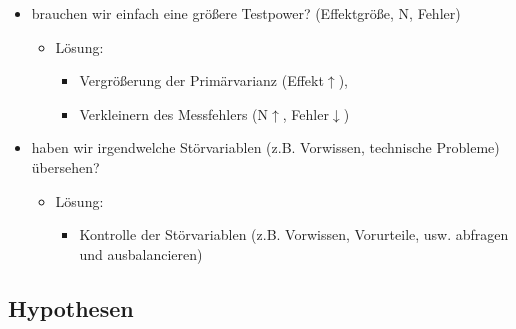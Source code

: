 \documentclass[
]{book}
\providecommand{\tightlist}{%
  \setlength{\itemsep}{0pt}\setlength{\parskip}{0pt}}
\begin{document}
\begin{itemize}
\item
  brauchen wir einfach eine größere Testpower? (Effektgröße, N, Fehler)

  \begin{itemize}
  \item
    Lösung:

    \begin{itemize}
    \tightlist
    \item
      Vergrößerung der Primärvarianz (Effekt\(\uparrow\)),
    \item
      Verkleinern des Messfehlers (N\(\uparrow\), Fehler\(\downarrow\))
    \end{itemize}
  \end{itemize}
\item
  haben wir irgendwelche Störvariablen (z.B. Vorwissen, technische Probleme) übersehen?

  \begin{itemize}
  \item
    Lösung:

    \begin{itemize}
    \tightlist
    \item
      Kontrolle der Störvariablen (z.B. Vorwissen, Vorurteile, usw. abfragen und ausbalancieren)
    \end{itemize}
  \end{itemize}
\end{itemize}

\hypertarget{hypothesen-2}{%
\subsection{Hypothesen}\label{hypothesen-2}}
\end{document}
